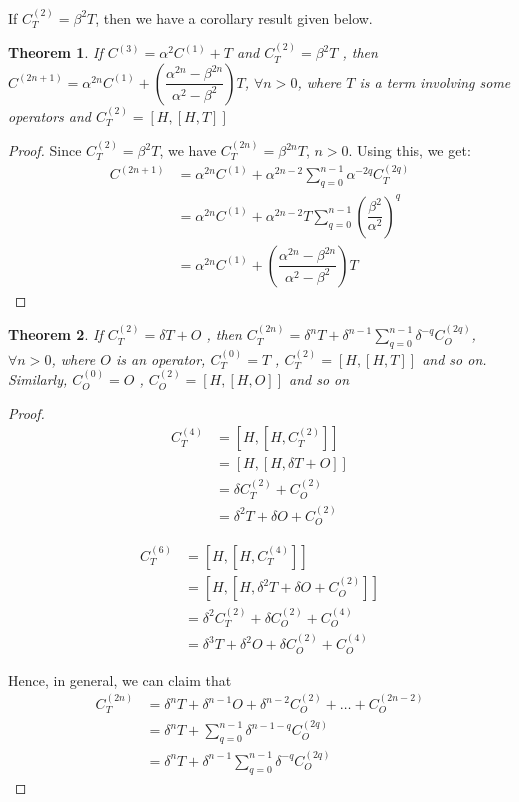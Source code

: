 \documentclass[11pt,a4paper]{article}
\newtheorem{thm}{Theorem}
\begin{document}
If $C^{(2)}_T= \beta^2 T $, then we have a corollary result given below.
\begin{thm}
If $C^{(3)}=  \alpha^2  C^{(1)} + T$ and $C^{(2)}_T= \beta^2 T $ , then $C^{(2n+1)}=\alpha^{2n} C^{(1)} +  \left(\dfrac{\alpha^{2n}- \beta ^{2n} }{\alpha^2- \beta ^2}\right)  T$, $\forall n>0$,  where $T$ is a term involving some operators and $ C^{(2)}_T=[H, [H, T]]$
\end{thm}

\begin{proof}
Since $C^{(2)}_T= \beta^2 T $, we have  $C^{(2n)}_T= \beta^{2n} T $, $n>0$. Using this, we get:
\begin{align*}
C^{(2n+1)} &=\alpha^{2n} C^{(1)} + \alpha^{2n-2} \sum_{q=0}^{n-1} \alpha^{-2q}C^{(2q)}_T \\
&=\alpha^{2n} C^{(1)} + \alpha^{2n-2} T \sum_{q=0}^{n-1}  \left(\dfrac{\beta^2}{\alpha^2}\right)^{q} \\
&=\alpha^{2n} C^{(1)} +  \left(\dfrac{\alpha^{2n}- \beta ^{2n} }{\alpha^2- \beta ^2}\right)  T
\end{align*}
\end{proof}




\begin{thm}
If $C^{(2)}_T=  \delta T + O$ , then $C^{(2n)}_T= \delta^{n} T +  \delta^{n-1} \sum_{q=0}^{n-1} \delta^{-q} C^{(2q)}_O  $, $\forall n>0$,  where $O$ is an operator,  $ C^{(0)}_T=T$ , $C^{(2)}_T=[H, [H, T]]$ and so on. Similarly,  $ C^{(0)}_O=O$ , $C^{(2)}_O=[H, [H, O]]$ and so on
\end{thm}


\begin{proof}

\begin{align}
C^{(4)}_T &= [H,[H,C^{(2)}_T]]\\
&=[H,[H, \delta T + O ]] \\
&=\delta C^{(2)}_T + C^{(2)}_O \\
&=\delta^2 T +\delta O + C^{(2)}_O
\end{align}

\begin{align}
C^{(6)}_T &= [H,[H,C^{(4)}_T]]\\
&=[H,[H, \delta^2 T +\delta O + C^{(2)}_O ]] \\
&=\delta^2 C^{(2)}_T + \delta C^{(2)}_O + C^{(4)}_O \\
&=\delta^3 T +\delta^2 O + \delta C^{(2)}_O + C^{(4)}_O
\end{align}

Hence, in general, we can claim that 
\begin{align*}
C^{(2n)}_T &=\delta^{n} T + \delta^{n-1} O + \delta^{n-2}  C^{(2)}_O + \ldots +    C^{(2n-2)}_O \\
&=\delta^{n} T + \sum_{q=0}^{n-1} \delta^{n-1-q}C^{(2q)}_O \\
&=\delta^{n} T +  \delta^{n-1} \sum_{q=0}^{n-1} \delta^{-q} C^{(2q)}_O 
\end{align*}

\end{proof}
\end{document}
